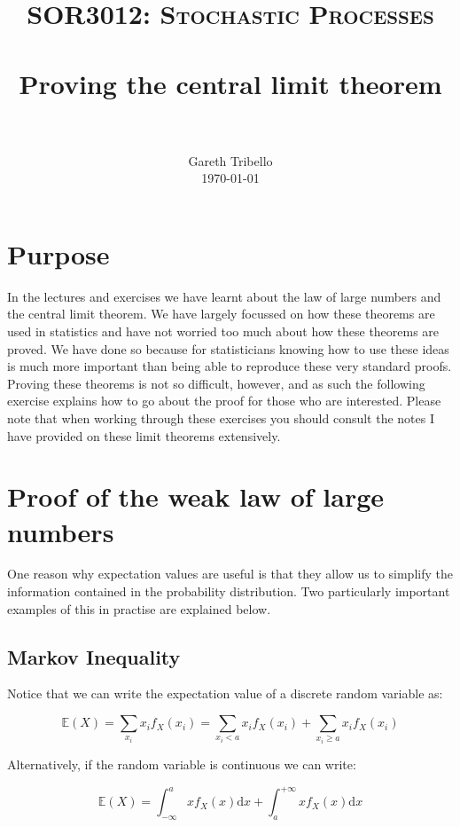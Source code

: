 \documentclass[paper=a4, fontsize=11pt]{scrartcl}
\title{\usefont{OT1}{bch}{b}{n} \normalfont \normalsize \textsc{SOR3012:
Stochastic Processes} \\ [25pt] \horrule{0.5pt} \\[0.4cm] 
\huge Proving the central limit theorem \\
\horrule{2pt} \\[0.5cm]
}
\author{ \normalfont
\normalsize
        Gareth Tribello \\[-3pt] \normalsize
        \today
}
\date{}
\numberwithin{equation}{section}
\numberwithin{figure}{section}
\numberwithin{table}{section}
\begin{document}
\maketitle

\section{Purpose}

In the lectures and exercises we have learnt about the law of large numbers and the central limit theorem.  We have largely focussed on how these theorems are used in statistics and have not worried 
too much about how these theorems are proved.  We have done so because for statisticians knowing how to use these ideas is much more important than being able to reproduce these very standard proofs. 
 Proving these theorems is not so difficult, however, and as such the following exercise explains how to go about the proof for those who are interested.  Please note that when working through these
exercises you should consult the notes I have provided on these limit theorems extensively. 


\section{Proof of the weak law of large numbers}

One reason why expectation values are useful is that they allow us to
simplify the information contained in the probability distribution.  Two
particularly important examples of this in practise are explained below.

\subsection{Markov Inequality}

Notice that we can write the expectation value of a discrete random variable as:

\begin{equation}
 \mathbb{E}(X) = \sum_{x_i} x_i f_X(x_i) = \sum_{x_i<a} x_i f_X(x_i) + \sum_{x_i
\ge a} x_i f_X(x_i)
\end{equation}

\noindent Alternatively, if the random variable is continuous we can write:

\begin{equation}
 \mathbb{E}(X) = \int_{-\infty}^a x f_X(x) \textrm{d}x + \int_a^{+\infty} x
f_X(x) \textrm{d}x
\end{equation}
\end{document}
